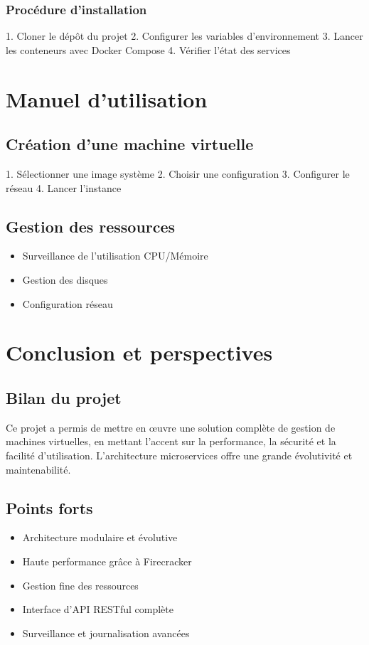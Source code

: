 \documentclass[12pt,a4paper]{report}
\begin{document}
\subsection{Procédure d'installation}
1. Cloner le dépôt du projet
2. Configurer les variables d'environnement
3. Lancer les conteneurs avec Docker Compose
4. Vérifier l'état des services

\chapter{Manuel d'utilisation}
\section{Création d'une machine virtuelle}
1. Sélectionner une image système
2. Choisir une configuration
3. Configurer le réseau
4. Lancer l'instance

\section{Gestion des ressources}
\begin{itemize}
    \item Surveillance de l'utilisation CPU/Mémoire
    \item Gestion des disques
    \item Configuration réseau
\end{itemize}

\chapter{Conclusion et perspectives}
\section{Bilan du projet}
Ce projet a permis de mettre en œuvre une solution complète de gestion de machines virtuelles, en mettant l'accent sur la performance, la sécurité et la facilité d'utilisation. L'architecture microservices offre une grande évolutivité et maintenabilité.

\section{Points forts}
\begin{itemize}
    \item Architecture modulaire et évolutive
    \item Haute performance grâce à Firecracker
    \item Gestion fine des ressources
    \item Interface d'API RESTful complète
    \item Surveillance et journalisation avancées
\end{itemize}
\end{document}
